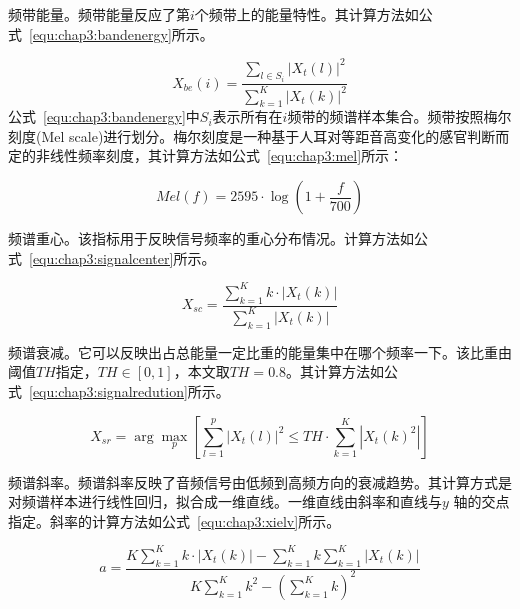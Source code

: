 \begin{compactenum}
\item 频带能量。频带能量反应了第$i$个频带上的能量特性。其计算方法如公式~\ref{equ:chap3:bandenergy}所示。

\begin{equation}
\label{equ:chap3:bandenergy}
{X_{be}}\left( i \right) = \frac{{\sum\limits_{l \in {S_i}} {{{\left| {{X_t}\left( l \right)} \right|}^2}} }}{{\sum\limits_{k = 1}^K {{{\left| {{X_t}\left( k \right)} \right|}^2}} }}
\end{equation}
公式~\ref{equ:chap3:bandenergy}中$S_i$表示所有在$i$频带的频谱样本集合。频带按照梅尔刻度(Mel scale)进行划分。梅尔刻度是一种基于人耳对等距音高变化的感官判断而定的非线性频率刻度，其计算方法如公式~\ref{equ:chap3:mel}所示：

\begin{equation}
\label{equ:chap3:mel}
Mel\left( f \right) = 2595 \cdot \log \left( {1 + \frac{f}{{700}}} \right)
\end{equation}


\item 频谱重心。该指标用于反映信号频率的重心分布情况。计算方法如公式~\ref{equ:chap3:signalcenter}所示。

\begin{equation}
\label{equ:chap3:signalcenter}
{X_{sc}} = \frac{{\sum\limits_{k = 1}^K {k \cdot \left| {{X_t}\left( k \right)} \right|} }}{{\sum\limits_{k = 1}^K {\left| {{X_t}\left( k \right)} \right|} }}
\end{equation}

\item 频谱衰减。它可以反映出占总能量一定比重的能量集中在哪个频率一下。该比重由阈值$TH$指定，$TH \in \left[ {0,1} \right]$，本文取$TH = 0.8$。其计算方法如公式~\ref{equ:chap3:signalredution}所示。


\begin{equation}
\label{equ:chap3:signalredution}
{X_{sr}} = \arg {\max _p}\left[ {\sum\limits_{l = 1}^p {{{\left| {{X_t}\left( l \right)} \right|}^2} \le TH \cdot \sum\limits_{k = 1}^K {\left| {{X_t}{{\left( k \right)}^2}} \right|} } } \right]
\end{equation}

\item 频谱斜率。频谱斜率反映了音频信号由低频到高频方向的衰减趋势。其计算方式是对频谱样本进行线性回归，拟合成一维直线。一维直线由斜率和直线与$y$ 轴的交点指定。斜率的计算方法如公式~\ref{equ:chap3:xielv}所示。

\begin{equation}
\label{equ:chap3:xielv}
a = \frac{{K\sum\limits_{k = 1}^K {k \cdot \left| {{X_t}\left( k \right)} \right| - \sum\limits_{k = 1}^K {k\sum\limits_{k = 1}^K {\left| {{X_t}\left( k \right)} \right|} } } }}{{K\sum\limits_{k = 1}^K {{k^2} - {{\left( {\sum\limits_{k = 1}^K k } \right)}^2}} }}
\end{equation}


\end{compactenum}

